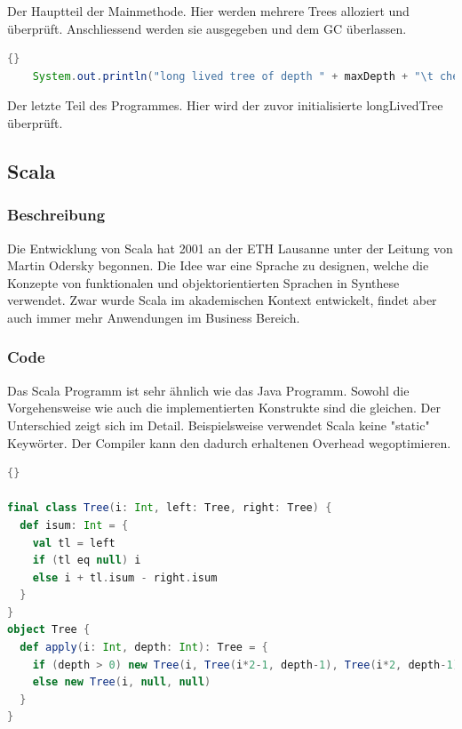 \documentclass{fancydocument}
\begin{document}
Der Hauptteil der Mainmethode. Hier werden mehrere Trees alloziert und
\"uberpr\"uft. Anschliessend werden sie ausgegeben und dem GC \"uberlassen. 

\begin{lstlisting}[language=java,caption=Long-Lived-Tree Check]{}
	System.out.println("long lived tree of depth " + maxDepth + "\t check: "+ longLivedTree.itemCheck());
\end{lstlisting}

Der letzte Teil des Programmes. Hier wird der zuvor initialisierte longLivedTree
\"uberpr\"uft.

\subsection{Scala}

\subsubsection{Beschreibung}

Die Entwicklung von Scala hat 2001 an der ETH Lausanne unter der Leitung von Martin
Odersky begonnen. Die Idee war eine Sprache zu designen, welche die
Konzepte von funktionalen und objektorientierten Sprachen in Synthese
verwendet. Zwar wurde Scala im akademischen Kontext entwickelt, findet
aber auch immer mehr Anwendungen im Business Bereich.

\subsubsection{Code}


Das Scala Programm ist sehr ähnlich wie das Java Programm. Sowohl die Vorgehensweise wie auch die implementierten Konstrukte sind die gleichen. Der
Unterschied zeigt sich im Detail. Beispielsweise verwendet Scala
keine "static" Keywörter. Der Compiler kann den dadurch erhaltenen
Overhead wegoptimieren.
\\

\begin{lstlisting}[language=scala,caption=Scala TreeNode]{}

final class Tree(i: Int, left: Tree, right: Tree) {
  def isum: Int = {
    val tl = left
    if (tl eq null) i
    else i + tl.isum - right.isum
  }
}
object Tree {
  def apply(i: Int, depth: Int): Tree = {
    if (depth > 0) new Tree(i, Tree(i*2-1, depth-1), Tree(i*2, depth-1))
    else new Tree(i, null, null)
  }
}
\end{lstlisting}
\end{document}
